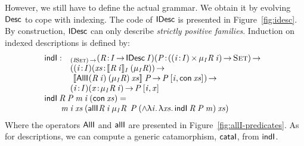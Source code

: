 \newcommand{\inductionI}{\F{indI}}
\newcommand{\cataI}{\F{cataI}}

However, we still have to define the actual grammar. We obtain it by
evolving $\Desc$ to cope with indexing.  The code of $\SYMBIDesc$ is presented in
Figure~\ref{fig:idesc}. By construction, $\SYMBIDesc$ can only
describe \emph{strictly positive families}. Induction on indexed
descriptions is defined by:
%
\[\stk{
\begin{array}{@{}ll}
\inductionI : & _{\PI{\V{I}}{\Set}}
                   \PITEL{\V{R}}{\V{I} \To \IDesc{\V{I}}}
                   \PI{\V{P}}{(\SIGMA{\V{i}}{\V{I}}{\IMu{\V{I}}{\V{R}}{\V{i}}}) \To \Set} \\
                 & (      \PITEL{\V{i}}{\V{I}} 
                          \PI{\V{xs}}{\idescop{\V{R}\: \V{i}}{\V{I}}{(\SYMBIMu_{\V{I}}{\V{R}})}} \\
                 & \   \idescop{\AllI{}
                                     {(\V{R}\: \V{i})}
                                     {(\SYMBIMu_{\V{I}}{\V{R}})}
                                     {\V{xs}}}
                               {}
                               {\V{P}} \To
                       \V{P}\: \pair{\V{i}}{\Con{\V{xs}}}{}) \To \\
                 & \PITEL{\V{i}}{\V{I}}
                   \PI{\V{x}}{\IMu{\V{I}}{\V{R}}{\V{i}}}
                   \V{P}\: \pair{\V{i}}{\V{x}}{}
\end{array} \\
\inductionI\: \V{R}\: \V{P}\: \V{m}\: \V{i}\: (\Con{\V{xs}}) =  \\
\qquad
    \V{m}\: \V{i}\: \V{xs}\: (\allI{}
                                    {\V{R}\: \V{i}}
                                    {\IMu{\V{I}}{\V{R}}{}}
                                    {\V{P}}
                                    {(\spl{\LAM{\V{i}}\LAM{\V{xs}} \inductionI\: \V{R}\: \V{P}\: \V{m}})}
                                    {\V{xs}})
}\]
%
Where the operators $\SYMBAllI$ and $\SYMBallI$ are
presented in Figure~\ref{fig:allI-predicates}. As for descriptions, we
can compute a generic catamorphism, $\cataI$, from $\inductionI$.


